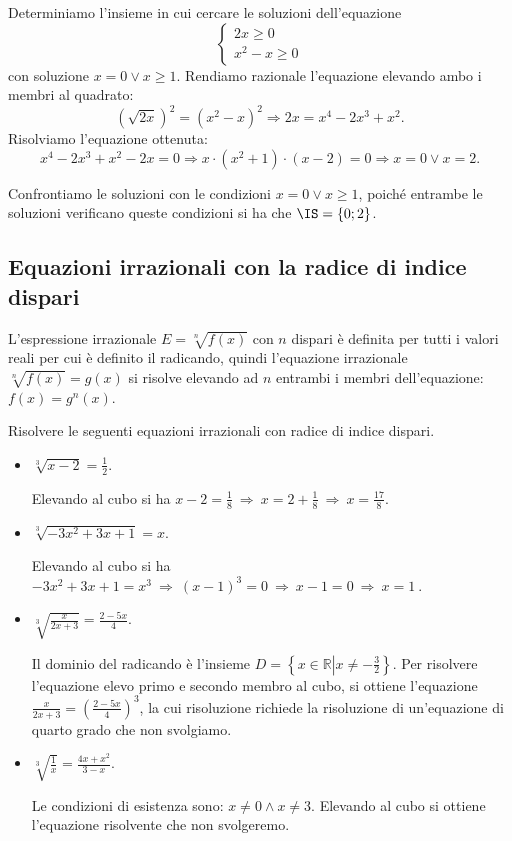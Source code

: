 \begin{exrig}
\begin{esempio}
\begin{itemize}
Determiniamo l’insieme in cui cercare le soluzioni dell’equazione 
\[\left\{\begin{array}{l}{2x\ge 0}\\{x^2-x\ge 0}\end{array}\right.\] 
con soluzione $x=0\vee x\ge 1$.
Rendiamo razionale l’equazione elevando ambo i membri al quadrato: 
\[\left(\sqrt{2x}\right)^2=\left(x^2-x\right)^2\Rightarrow 2x=x^4-2x^3+x^2.\]
Risolviamo l’equazione ottenuta: 
\[x^4-2x^3+x^2-2x=0\Rightarrow x\cdot \left(x^2+1\right)\cdot (x-2)=0\Rightarrow x=0\vee x=2.\]

Confrontiamo le soluzioni con le condizioni $x=0\vee x\ge 1$, poiché entrambe le soluzioni verificano queste condizioni si ha che $\IS=\{0;2\}$.
\end{itemize}
\end{esempio}
\end{exrig}

\subsection{Equazioni irrazionali con la radice di indice dispari}
L’espressione irrazionale $E=\sqrt[n]{f(x)}$ con $n$ dispari è definita per tutti i valori reali per cui è definito il radicando, quindi l’equazione irrazionale $\sqrt[n]{f(x)}=g(x)$ si risolve elevando ad $n$ entrambi i membri dell'equazione: $f(x)=g^n(x)$.

\begin{exrig}
\begin{esempio}
Risolvere le seguenti equazioni irrazionali con radice di indice dispari.
\begin{itemize}
\item $ \sqrt[3]{x-2}=\frac 1 2 $.

Elevando al cubo si ha $x-2=\frac 1 8\ \Rightarrow \ x=2+\frac 1 8\ \Rightarrow \ x=\frac{17} 8$.

\item $ \sqrt[3]{-3x^2+3x+1}=x $.

Elevando al cubo si ha $-3x^2+3x+1=x^3\ \Rightarrow \ (x-1)^3=0\ \Rightarrow \ x-1=0\ \Rightarrow \ x=1\ $.

\item $ \sqrt[3]{\frac x{2x+3}}=\frac{2-5x} 4 $.

Il dominio del radicando è l’insieme $D=\left\{x\in \mathbb{R}\left|x\neq -\frac 3 2\right.\right\}$. Per risolvere l'equazione elevo primo e secondo membro al cubo, si ottiene l'equazione $\frac x{2x+3}=\left(\frac{2-5x} 4\right)^3$, la cui risoluzione richiede la risoluzione di un'equazione di quarto grado che non svolgiamo.

\item $ \sqrt[3]{\frac 1 x}=\frac{4x+x^2}{3-x} $.

Le condizioni di esistenza sono: $x\neq 0\wedge x\neq 3$. Elevando al cubo si ottiene l'equazione risolvente che non svolgeremo.
\end{itemize}
\end{esempio}
\end{exrig}

